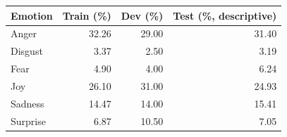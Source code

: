 \begin{tabular}{lrrr}
\toprule
Emotion & Train (\%) & Dev (\%) & Test (\%, descriptive) \\
\midrule
Anger & 32.26 & 29.00 & 31.40 \\
Disgust & 3.37 & 2.50 & 3.19 \\
Fear & 4.90 & 4.00 & 6.24 \\
Joy & 26.10 & 31.00 & 24.93 \\
Sadness & 14.47 & 14.00 & 15.41 \\
Surprise & 6.87 & 10.50 & 7.05 \\
\bottomrule
\end{tabular}
